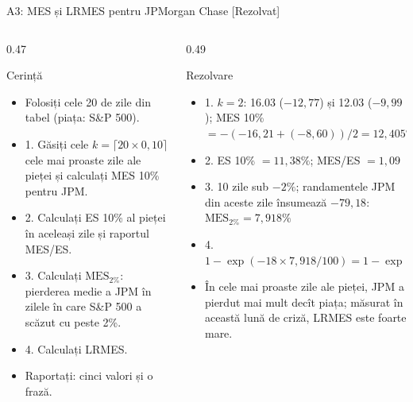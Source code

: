 \begin{frame}{A3: MES și LRMES pentru JPMorgan Chase [Rezolvat]}
\itemsize{\scriptsize}
\begin{columns}[T]
\begin{column}{0.47\textwidth}
\begin{block}{Cerință}
\begin{itemize}
    \item Folosiți cele 20 de zile din tabel (piața: S\&P 500).
    \item 1. Găsiți cele $k = \lceil 20 \times 0{,}10 \rceil$ cele mai proaste zile ale pieței și calculați MES 10\% pentru JPM.
    \item 2. Calculați ES 10\% al pieței în aceleași zile și raportul MES/ES.
    \item 3. Calculați $\mathrm{MES}_{2\%}$: pierderea medie a JPM în zilele în care S\&P 500 a scăzut cu peste 2\%.
    \item 4. Calculați LRMES.
    \item Raportați: cinci valori și o frază.
\end{itemize}
\end{block}
\end{column}
\begin{column}{0.49\textwidth}
\begin{exampleblock}{Rezolvare}
\begin{itemize}
    \item 1. $k = 2$: 16.03 ($-12{,}77$) și 12.03 ($-9{,}99$); MES 10\% $= -(-16{,}21 + (-8{,}60))/2 = 12{,}405\%$
    \item 2. ES 10\% $= 11{,}38\%$; MES/ES $= 1{,}09$
    \item 3. 10 zile sub $-2\%$; randamentele JPM din aceste zile însumează $-79{,}18$: $\mathrm{MES}_{2\%} = 7{,}918\%$
    \item 4. $1 - \exp(-18 \times 7{,}918/100) = 1 - \exp(-1{,}4252) = 1 - 0{,}2405 = 75{,}95\%$
    \item În cele mai proaste zile ale pieței, JPM a pierdut mai mult decît piața; măsurat în această lună de criză, LRMES este foarte mare.
\end{itemize}
\end{exampleblock}
\end{column}
\end{columns}
\end{frame}

